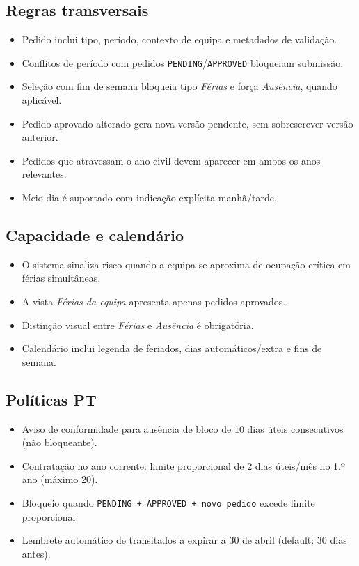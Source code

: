 \documentclass[11pt,a4paper,twoside]{article}
\begin{document}
\subsection{Regras transversais}
\begin{itemize}
  \item Pedido inclui tipo, período, contexto de equipa e metadados de validação.
  \item Conflitos de período com pedidos \texttt{PENDING}/\texttt{APPROVED} bloqueiam submissão.
  \item Seleção com fim de semana bloqueia tipo \textit{Férias} e força \textit{Ausência}, quando aplicável.
  \item Pedido aprovado alterado gera nova versão pendente, sem sobrescrever versão anterior.
  \item Pedidos que atravessam o ano civil devem aparecer em ambos os anos relevantes.
  \item Meio-dia é suportado com indicação explícita manhã/tarde.
\end{itemize}

\subsection{Capacidade e calendário}
\begin{itemize}
  \item O sistema sinaliza risco quando a equipa se aproxima de ocupação crítica em férias simultâneas.
  \item A vista \textit{Férias da equipa} apresenta apenas pedidos aprovados.
  \item Distinção visual entre \textit{Férias} e \textit{Ausência} é obrigatória.
  \item Calendário inclui legenda de feriados, dias automáticos/extra e fins de semana.
\end{itemize}

\subsection{Políticas PT}
\begin{itemize}
  \item Aviso de conformidade para ausência de bloco de 10 dias úteis consecutivos (não bloqueante).
  \item Contratação no ano corrente: limite proporcional de 2 dias úteis/mês no 1.º ano (máximo 20).
  \item Bloqueio quando \texttt{PENDING + APPROVED + novo pedido} excede limite proporcional.
  \item Lembrete automático de transitados a expirar a 30 de abril (default: 30 dias antes).
\end{itemize}
\end{document}
